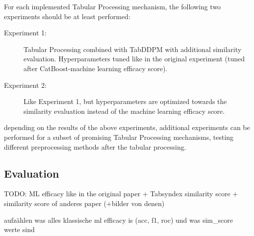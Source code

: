 For each implemented Tabular Processing mechanism, the following two experiments should be at least performed:

\begin{description}
    \item[Experiment 1:] Tabular Processing combined with TabDDPM with additional similarity evaluation. Hyperparameters tuned like in the original experiment (tuned after CatBoost-machine learning efficacy score).
    \item[Experiment 2:] Like Experiment 1, but hyperparameters are optimized towards the similarity evaluation instead of the machine learning efficacy score.
\end{description}

depending on the results of the above experiments, additional experiments can be performed for a subset of promising Tabular Processing mechanisms, \eg testing different preprocessing methods after the tabular processing.

\subsection[]{Evaluation}
\label{ch:conceptualDesign-Evaluation}
TODO:
ML efficacy like in the original paper + Tabsyndex similarity score + similarity score of anderes paper (+bilder von denen)

aufzählen was alles klassische ml efficacy is (acc, f1, roc) und was sim_score werte sind